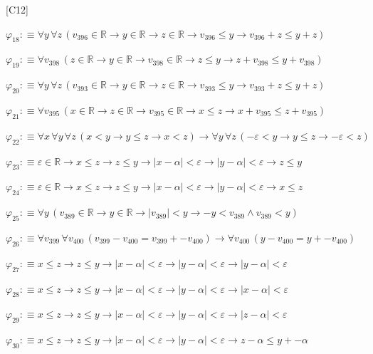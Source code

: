 \begin{fullproof}{[C12]}
\begin{abbrevlist}
\item $\varphi_{18} :\equiv \forall y\,\forall z\,(v_{396} \in \mathbb{R} \to y \in \mathbb{R} \to z \in \mathbb{R} \to v_{396} \leq y \to v_{396} + z \leq y + z)$
\item $\varphi_{19} :\equiv \forall v_{398}\,(z \in \mathbb{R} \to y \in \mathbb{R} \to v_{398} \in \mathbb{R} \to z \leq y \to z + v_{398} \leq y + v_{398})$
\item $\varphi_{20} :\equiv \forall y\,\forall z\,(v_{393} \in \mathbb{R} \to y \in \mathbb{R} \to z \in \mathbb{R} \to v_{393} \leq y \to v_{393} + z \leq y + z)$
\item $\varphi_{21} :\equiv \forall v_{395}\,(x \in \mathbb{R} \to z \in \mathbb{R} \to v_{395} \in \mathbb{R} \to x \leq z \to x + v_{395} \leq z + v_{395})$
\item $\varphi_{22} :\equiv \forall x\,\forall y\,\forall z\,(x < y \to y \leq z \to x < z) \to \forall y\,\forall z\,(-\varepsilon < y \to y \leq z \to -\varepsilon < z)$
\item $\varphi_{23} :\equiv \varepsilon \in \mathbb{R} \to x \leq z \to z \leq y \to \lvert x - \alpha \rvert < \varepsilon \to \lvert y - \alpha \rvert < \varepsilon \to z \leq y$
\item $\varphi_{24} :\equiv \varepsilon \in \mathbb{R} \to x \leq z \to z \leq y \to \lvert x - \alpha \rvert < \varepsilon \to \lvert y - \alpha \rvert < \varepsilon \to x \leq z$
\item $\varphi_{25} :\equiv \forall y\,(v_{389} \in \mathbb{R} \to y \in \mathbb{R} \to \lvert v_{389} \rvert < y \to -y < v_{389} \land v_{389} < y)$
\item $\varphi_{26} :\equiv \forall v_{399}\,\forall v_{400}\,(v_{399} - v_{400} = v_{399} + -v_{400}) \to \forall v_{400}\,(y - v_{400} = y + -v_{400})$
\item $\varphi_{27} :\equiv x \leq z \to z \leq y \to \lvert x - \alpha \rvert < \varepsilon \to \lvert y - \alpha \rvert < \varepsilon \to \lvert y - \alpha \rvert < \varepsilon$
\item $\varphi_{28} :\equiv x \leq z \to z \leq y \to \lvert x - \alpha \rvert < \varepsilon \to \lvert y - \alpha \rvert < \varepsilon \to \lvert x - \alpha \rvert < \varepsilon$
\item $\varphi_{29} :\equiv x \leq z \to z \leq y \to \lvert x - \alpha \rvert < \varepsilon \to \lvert y - \alpha \rvert < \varepsilon \to \lvert z - \alpha \rvert < \varepsilon$
\item $\varphi_{30} :\equiv x \leq z \to z \leq y \to \lvert x - \alpha \rvert < \varepsilon \to \lvert y - \alpha \rvert < \varepsilon \to z - \alpha \leq y + -\alpha$

\end{abbrevlist}
\end{fullproof}
